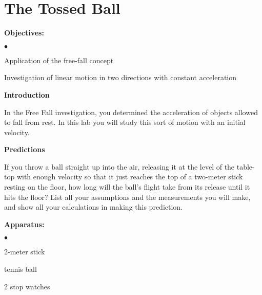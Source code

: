 
\section{The Tossed Ball}

\makelabheader %

{\noindent \bf Objectives:} \begin{list}{$\bullet$}{\itemsep0pt }

\item Application of the free-fall concept \item Investigation of linear motion in two directions with constant acceleration

\end{list}

{\noindent \bf Introduction}

{\noindent In the Free Fall investigation, you determined the acceleration of objects allowed to fall from rest. In this lab you will study this sort of motion with an initial velocity.}

\medskip

{\noindent \bf Predictions}

{\noindent If you throw a ball straight up into the air, releasing it at the level of the table-top with enough velocity so that it just reaches the top of a two-meter stick resting on the floor, how long will the ball's flight take from its release until it hits the floor? List all your assumptions and the measurements you will make, and show all your calculations in making this prediction.}

\vspace{100pt}

{\noindent \bf Apparatus:} \begin{list}{$\bullet$}{\itemsep0pt }

\item 2-meter stick \item tennis ball \item 2 stop watches

\end{list}

